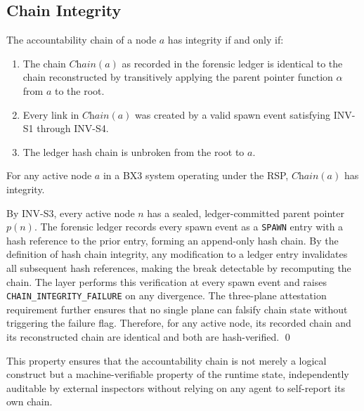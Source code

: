 \subsection{Chain Integrity}
\label{sec:chain-integrity}

\begin{definition}
The accountability chain of a node $a$ has integrity if and only if:
\begin{enumerate}
    \item The chain $\textit{Chain}(a)$ as recorded in the forensic ledger is identical to the chain reconstructed by transitively applying the parent pointer function $\alpha$ from $a$ to the root.
    \item Every link in $\textit{Chain}(a)$ was created by a valid spawn event satisfying INV-S1 through INV-S4.
    \item The ledger hash chain is unbroken from the root to $a$.
\end{enumerate}
\end{definition}

\begin{property}
For any active node $a$ in a BX3 system operating under the RSP, $\textit{Chain}(a)$ has integrity.
\end{property}

\begin{Proof}
By INV-S3, every active node $n$ has a sealed, ledger-committed parent pointer $p(n)$. The forensic ledger records every spawn event as a \texttt{SPAWN} entry with a hash reference to the prior entry, forming an append-only hash chain. By the definition of hash chain integrity, any modification to a ledger entry invalidates all subsequent hash references, making the break detectable by recomputing the chain. The \fact{} layer performs this verification at every spawn event and raises \texttt{CHAIN\_INTEGRITY\_FAILURE} on any divergence. The three-plane attestation requirement further ensures that no single plane can falsify chain state without triggering the failure flag. Therefore, for any active node, its recorded chain and its reconstructed chain are identical and both are hash-verified. \qed
\end{Proof}

This property ensures that the accountability chain is not merely a logical construct but a machine-verifiable property of the runtime state, independently auditable by external inspectors without relying on any agent to self-report its own chain.

